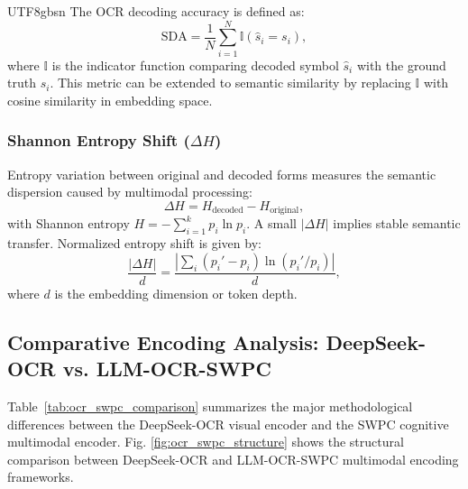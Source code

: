 \documentclass[conference]{IEEEtran}
\begin{document}
\begin{CJK*}{UTF8}{gbsn}
The OCR decoding accuracy is defined as:
\begin{equation}
\text{SDA} = \frac{1}{N} \sum_{i=1}^{N} \mathbb{I}(\hat{s}_i = s_i),
\end{equation}
where $\mathbb{I}$ is the indicator function comparing decoded symbol $\hat{s}_i$ with the ground truth $s_i$.  
This metric can be extended to semantic similarity by replacing $\mathbb{I}$ with cosine similarity in embedding space.

\subsubsection{Shannon Entropy Shift ($\Delta H$)}

Entropy variation between original and decoded forms measures the semantic dispersion caused by multimodal processing:
\begin{equation}
\Delta H = H_{\text{decoded}} - H_{\text{original}},
\end{equation}
with Shannon entropy $H = - \sum_{i=1}^{k} p_i \ln p_i$.  
A small $|\Delta H|$ implies stable semantic transfer.  
Normalized entropy shift is given by:
\begin{equation}
\frac{|\Delta H|}{d} = \frac{|\sum_i (p_i' - p_i)\ln(p_i'/p_i)|}{d},
\end{equation}
where $d$ is the embedding dimension or token depth.

\subsection{Comparative Encoding Analysis: DeepSeek-OCR vs. LLM-OCR-SWPC}

Table~\ref{tab:ocr_swpc_comparison} summarizes the major methodological differences between the DeepSeek-OCR visual encoder and the SWPC cognitive multimodal encoder. Fig. \ref{fig:ocr_swpc_structure} shows the structural comparison between DeepSeek-OCR and LLM-OCR-SWPC multimodal encoding frameworks.


\end{CJK*}
\end{document}
